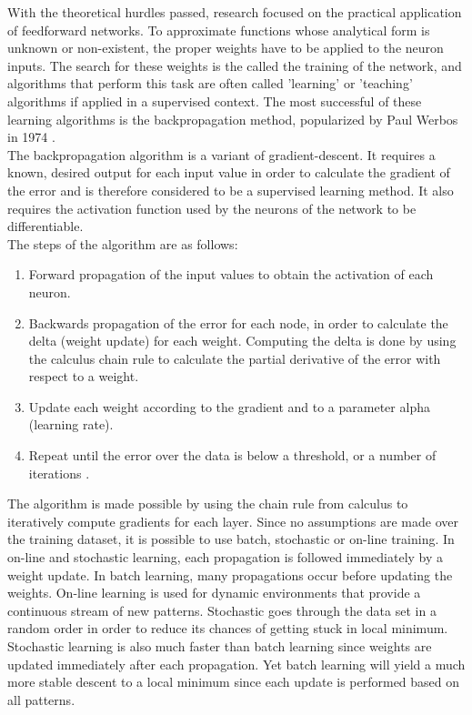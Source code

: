 \documentclass[12pt,oneside]{CUNY_CS_PhD}
\begin{document}
With the theoretical hurdles passed, research focused on the practical application of feedforward networks. To approximate functions whose analytical form is unknown or non-existent, the proper weights have to be applied to the neuron inputs. The search for these weights is the called the training of the network, and algorithms that perform this task are often called 'learning' or 'teaching' algorithms if applied in a supervised context. The most successful of these learning algorithms is the backpropagation method, popularized by Paul Werbos in 1974 \cite{werbos_backpropagation_1990}.\\
The backpropagation algorithm is a variant of gradient-descent. It requires a known, desired output for each input value in order to calculate the gradient of the error and is therefore considered to be a supervised learning method. It also requires the activation function used by the neurons of the network to be differentiable.\\
The steps of the algorithm are as follows:
\begin{enumerate}
\item Forward propagation of the input values to obtain the activation of each neuron.
\item Backwards propagation of the error for each node, in order to calculate the delta (weight update) for each weight. Computing the delta is done by using the calculus chain rule to calculate the partial derivative of the error with respect to a  weight.
\item Update each weight according to the gradient and to a parameter alpha (learning rate).
\item Repeat until the error over the data is below a threshold, or a number of iterations .
\end{enumerate}
The algorithm is made possible by using the chain rule from calculus to iteratively compute gradients for each layer. Since no assumptions are made over the training dataset, it is possible to use batch, stochastic or on-line training. In on-line and stochastic learning, each propagation is followed immediately by a weight update. In batch learning, many propagations occur before updating the weights. On-line learning is used for dynamic environments that provide a continuous stream of new patterns. Stochastic goes through the data set in a random order in order to reduce its chances of getting stuck in local minimum. Stochastic learning is also much faster than batch learning since weights are updated immediately after each propagation. Yet batch learning will yield a much more stable descent to a local minimum since each update is performed based on all patterns.\\
\end{document}
